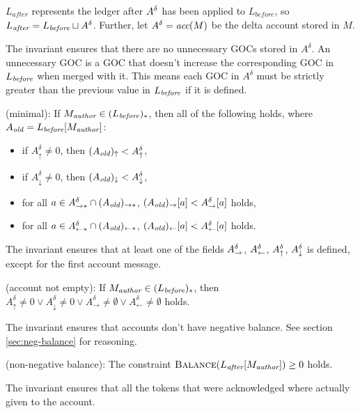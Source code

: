 $L_\textit{after}$ represents the ledger after $A^\delta$ has been applied to $L_\textit{before}$, so $L_\emph{after} = L_\emph{before} \sqcup A^\delta$.
Further, let $A^\delta = \textit{acc}(M)$ be the delta account stored in $M$.

The invariant  ensures that there are no unnecessary GOCs stored in $A^\delta$. An unnecessary GOC is a GOC that doesn't increase the corresponding GOC in $L_\emph{before}$ when merged with it. This means each GOC in $A^\delta$ must be strictly greater than the previous value in $L_\emph{before}$ if it is defined.
\begin{invariant}{}
    (minimal):
    If $M_\emph{author} \in (L_\emph{before})_*$, then all of the following holds, where $A_\emph{old} = L_\emph{before}[M_\emph{author}]$:
    \begin{itemize}
        \item if $A^\delta_\uparrow \neq 0$, then $(A_\emph{old})_\uparrow < A^\delta_\uparrow$,
        \item if $A^\delta_\downarrow \neq 0$, then $(A_\emph{old})_\downarrow < A^\delta_\downarrow$,
        \item for all $a \in A^\delta_{\rightarrow*} \cap (A_\emph{old})_{\rightarrow*}$, $(A_\emph{old})_{\rightarrow}[a] < A^\delta_{\rightarrow}[a]$ holds,
        \item for all $a \in A^\delta_{\leftarrow*} \cap (A_\emph{old})_{\leftarrow*}$, $(A_\emph{old})_{\leftarrow}[a] < A^\delta_{\leftarrow}[a]$ holds.
    \end{itemize}
\end{invariant}
The invariant  ensures that at least one of the fields $A^\delta_\rightarrow$, $A^\delta_\leftarrow$, $A^\delta_\uparrow$, $A^\delta_\downarrow$ is defined, except for the first account message.
\begin{invariant}{}
    (account not empty): If $M_\emph{author} \in (L_\emph{before})_*$, then
    $A^\delta_\uparrow \neq 0 \lor A^\delta_\downarrow \neq 0 \lor A^\delta_\rightarrow \neq \emptyset \lor A^\delta_\leftarrow \neq \emptyset$ holds.
\end{invariant}
The invariant  ensures that accounts don't have negative balance. See section \ref{sec:neg-balance} for reasoning.
\begin{invariant}{}
    (non-negative balance): The constraint $\textsc{Balance}(L_\textit{after}[M_\emph{author}]) \ge 0$ holds.
\end{invariant}
The invariant  ensures that all the tokens that were acknowledged where actually given to the account.
